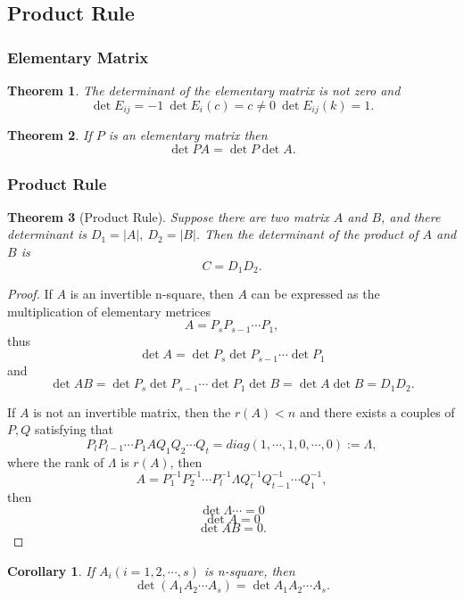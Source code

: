 \documentclass{article}
\newtheorem{theorem}{Theorem}[section]
\newtheorem{corollary}{Corollary}[theorem]
\theoremstyle{definition}
\begin{document}
\subsection{Product Rule}

\subsubsection{Elementary Matrix}

\begin{theorem}
    The determinant of the elementary matrix is not zero and 
    $$\det E_{ij}=-1\ \det E_{i}(c)=c\neq 0\ \det E_{ij}(k)=1.$$
\end{theorem}

\begin{theorem}
    If $P$ is an elementary matrix then 
    $$\det PA = \det P\det A.$$
\end{theorem}

\subsubsection{Product Rule}
\begin{theorem}[Product Rule]
    Suppose there are two matrix $A$ and $B$,
    and there determinant is $D_{1}=|A|,\ D_{2}=|B|$.
    Then the determinant of the product of $A$ and $B$ is
    $$C=D_{1}D_{2}.$$
\end{theorem}

\begin{proof}
    If $A$ is an invertible n-square, then $A$ can be expressed as the multiplication 
    of elementary metrices
    $$A=P_{s}P_{s-1}\cdots P_{1},$$
    thus $$\det A =\det P_{s}\det P_{s-1}\cdots \det P_{1}$$
    and $$\det AB = \det P_{s}\det P_{s-1}\cdots \det P_{1} \det B=\det A \det B= D_{1}D_{2}.$$

    If $A$ is not an invertible matrix, then the $r(A)<n$ and there exists a couples of $P,Q$ satisfying that 
    $$P_{l}P_{l-1}\cdots P_{1}AQ_{1}Q_{2}\cdots Q_{t}=diag(1,\cdots,1,0,\cdots,0):= \Lambda ,$$
    where the rank of $\Lambda$ is $r(A)$, then 
    $$A = P^{-1}_{1}P^{-1}_{2}\cdots P^{-1}_{l}\Lambda Q^{-1}_{t}Q^{-1}_{t-1}\cdots Q^{-1}_{1},$$
    then $$\det \Lambda\cdots =0$$
    $$\det A = 0$$
    $$\det AB = 0.$$
\end{proof}

\begin{corollary}
    If $A_{i}(i=1,2,\cdots,s)$ is n-square, then 
    $$\det (A_{1}A_{2}\cdots A_{s})=\det A_{1}A_{2}\cdots A_{s}.$$
\end{corollary}
\end{document}
